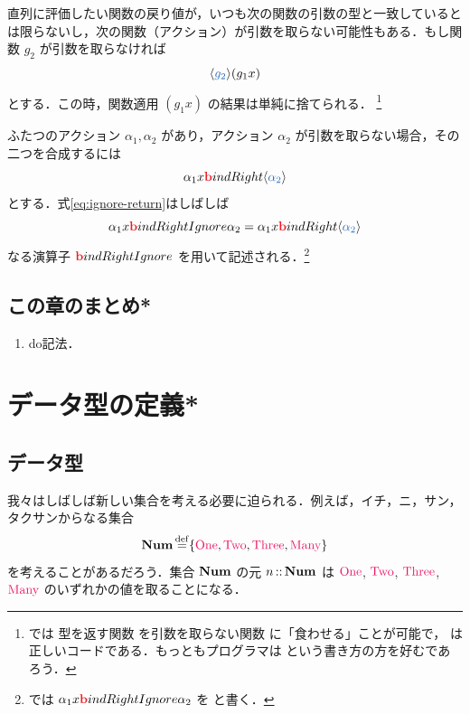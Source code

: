 \documentclass[a5paper,twoside,fleqn,draft]{jsbook}
\begin{document}
直列に評価したい関数の戻り値が，いつも次の関数の引数の型と一致しているとは限らないし，次の関数（アクション）が引数を取らない可能性もある．もし関数 $g_2$ が引数を取らなければ
\begin{equation}
\mConstWith{g_2}(g_1x)
\end{equation}
とする．この時，関数適用 $(g_1x)$ の結果は単純に捨てられる．
\footnote{\clang では  型を返す関数  を引数を取らない関数  に「食わせる」ことが可能で， は正しいコードである．もっとも\clang プログラマは  という書き方の方を好むであろう．}

\separator

ふたつのアクション $\alpha_1,\alpha_2$ があり，アクション $\alpha_2$ が引数を取らない場合，その二つを合成するには
\begin{equation}
\label{eq:ignore-return}
\alpha_1 x\hTypeName{b}indRight\mConstWith{\alpha_2}
\end{equation}
とする．式\eqref{eq:ignore-return}はしばしば
\begin{equation}
\alpha_1 x\hTypeName{b}indRightIgnore\alpha_2=\alpha_1x\hTypeName{b}indRight\mConstWith{\alpha_2}
\end{equation}
なる演算子 $\hTypeName{b}indRightIgnore$ を用いて記述される．\footnote{\haskell では $\alpha_1x\hTypeName{b}indRightIgnore\alpha_2$ を  と書く．}

\section{この章のまとめ*}

\begin{enumerate}
\item do記法．
\end{enumerate}

\chapter{データ型の定義*}
\label{ch:data-type}

\section{データ型}

我々はしばしば新しい集合を考える必要に迫られる．例えば，イチ，ニ，サン，タクサンからなる集合
\begin{equation}
\mSet{Num}\mDefEq\{\mNumOne,\mNumTwo,\mNumThree,\mNumMany\}
\end{equation}
を考えることがあるだろう．集合 $\mathbf{Num}$ の元 $n\operatorname{:\!:}\mathbf{Num}$ は $\mNumOne$, $\mNumTwo$, $\mNumThree$, $\mNumMany$ のいずれかの値を取ることになる．
\end{document}
